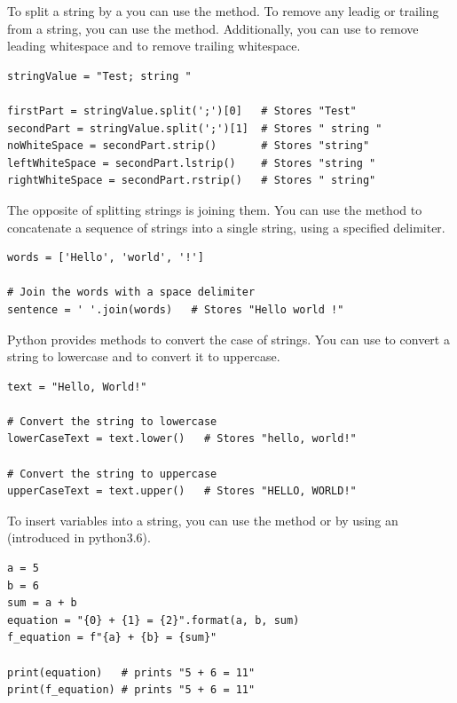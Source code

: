To split a string by a  you can use the  method. To remove any leadig or trailing  from a string, you can use the  method. Additionally, you can use  to remove leading whitespace and  to remove trailing whitespace.
\begin{lstlisting}
stringValue = "Test; string "

firstPart = stringValue.split(';')[0] 	# Stores "Test"
secondPart = stringValue.split(';')[1]	# Stores " string "
noWhiteSpace = secondPart.strip()       # Stores "string"
leftWhiteSpace = secondPart.lstrip()    # Stores "string "
rightWhiteSpace = secondPart.rstrip()   # Stores " string"
\end{lstlisting}

The opposite of splitting strings is joining them. You can use the  method to concatenate a sequence of strings into a single string, using a specified delimiter.
\begin{lstlisting}
words = ['Hello', 'world', '!']

# Join the words with a space delimiter
sentence = ' '.join(words)   # Stores "Hello world !"
\end{lstlisting}

Python provides methods to convert the case of strings. You can use  to convert a string to lowercase and  to convert it to uppercase.

\begin{lstlisting}
text = "Hello, World!"

# Convert the string to lowercase
lowerCaseText = text.lower()   # Stores "hello, world!"

# Convert the string to uppercase
upperCaseText = text.upper()   # Stores "HELLO, WORLD!"
\end{lstlisting}

To insert variables into a string, you can use the  method or by using an  (introduced in python3.6).
\begin{lstlisting}
a = 5
b = 6
sum = a + b
equation = "{0} + {1} = {2}".format(a, b, sum)
f_equation = f"{a} + {b} = {sum}"

print(equation)   # prints "5 + 6 = 11"
print(f_equation) # prints "5 + 6 = 11"
\end{lstlisting}










